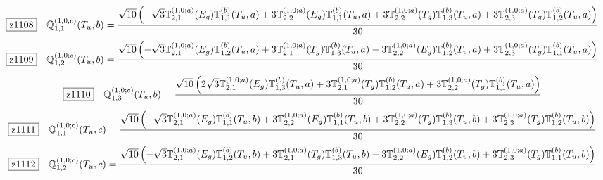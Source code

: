 \documentclass[fleqn,10pt,landscape]{jsarticle}
\begin{document}
\begin{dmath*}
\hspace*{3mm}\fbox{z1108}\quad \mathbb{Q}_{1,1}^{(1,0;c)}(T_{u},b)=\frac{\sqrt{10} \left(- \sqrt{3} \mathbb{T}_{2,1}^{(1,0;a)}(E_{g}) \mathbb{T}_{1,1}^{(b)}(T_{u},a) + 3 \mathbb{T}_{2,2}^{(1,0;a)}(E_{g}) \mathbb{T}_{1,1}^{(b)}(T_{u},a) + 3 \mathbb{T}_{2,2}^{(1,0;a)}(T_{g}) \mathbb{T}_{1,3}^{(b)}(T_{u},a) + 3 \mathbb{T}_{2,3}^{(1,0;a)}(T_{g}) \mathbb{T}_{1,2}^{(b)}(T_{u},a)\right)}{30}
\end{dmath*}
\begin{dmath*}
\hspace*{3mm}\fbox{z1109}\quad \mathbb{Q}_{1,2}^{(1,0;c)}(T_{u},b)=\frac{\sqrt{10} \left(- \sqrt{3} \mathbb{T}_{2,1}^{(1,0;a)}(E_{g}) \mathbb{T}_{1,2}^{(b)}(T_{u},a) + 3 \mathbb{T}_{2,1}^{(1,0;a)}(T_{g}) \mathbb{T}_{1,3}^{(b)}(T_{u},a) - 3 \mathbb{T}_{2,2}^{(1,0;a)}(E_{g}) \mathbb{T}_{1,2}^{(b)}(T_{u},a) + 3 \mathbb{T}_{2,3}^{(1,0;a)}(T_{g}) \mathbb{T}_{1,1}^{(b)}(T_{u},a)\right)}{30}
\end{dmath*}
\begin{dmath*}
\hspace*{3mm}\fbox{z1110}\quad \mathbb{Q}_{1,3}^{(1,0;c)}(T_{u},b)=\frac{\sqrt{10} \left(2 \sqrt{3} \mathbb{T}_{2,1}^{(1,0;a)}(E_{g}) \mathbb{T}_{1,3}^{(b)}(T_{u},a) + 3 \mathbb{T}_{2,1}^{(1,0;a)}(T_{g}) \mathbb{T}_{1,2}^{(b)}(T_{u},a) + 3 \mathbb{T}_{2,2}^{(1,0;a)}(T_{g}) \mathbb{T}_{1,1}^{(b)}(T_{u},a)\right)}{30}
\end{dmath*}
\begin{dmath*}
\hspace*{3mm}\fbox{z1111}\quad \mathbb{Q}_{1,1}^{(1,0;c)}(T_{u},c)=\frac{\sqrt{10} \left(- \sqrt{3} \mathbb{T}_{2,1}^{(1,0;a)}(E_{g}) \mathbb{T}_{1,1}^{(b)}(T_{u},b) + 3 \mathbb{T}_{2,2}^{(1,0;a)}(E_{g}) \mathbb{T}_{1,1}^{(b)}(T_{u},b) + 3 \mathbb{T}_{2,2}^{(1,0;a)}(T_{g}) \mathbb{T}_{1,3}^{(b)}(T_{u},b) + 3 \mathbb{T}_{2,3}^{(1,0;a)}(T_{g}) \mathbb{T}_{1,2}^{(b)}(T_{u},b)\right)}{30}
\end{dmath*}
\begin{dmath*}
\hspace*{3mm}\fbox{z1112}\quad \mathbb{Q}_{1,2}^{(1,0;c)}(T_{u},c)=\frac{\sqrt{10} \left(- \sqrt{3} \mathbb{T}_{2,1}^{(1,0;a)}(E_{g}) \mathbb{T}_{1,2}^{(b)}(T_{u},b) + 3 \mathbb{T}_{2,1}^{(1,0;a)}(T_{g}) \mathbb{T}_{1,3}^{(b)}(T_{u},b) - 3 \mathbb{T}_{2,2}^{(1,0;a)}(E_{g}) \mathbb{T}_{1,2}^{(b)}(T_{u},b) + 3 \mathbb{T}_{2,3}^{(1,0;a)}(T_{g}) \mathbb{T}_{1,1}^{(b)}(T_{u},b)\right)}{30}
\end{dmath*}
\end{document}
